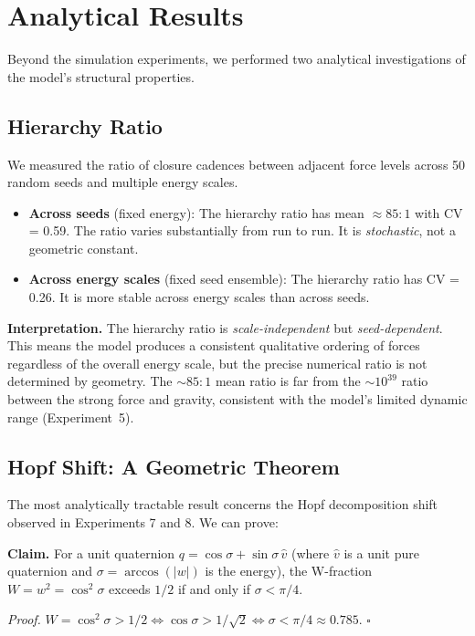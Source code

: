 \documentclass[letterpaper,12pt]{article}
\begin{document}
\section{Analytical Results}

Beyond the simulation experiments, we performed two analytical investigations of the model's structural properties.

\subsection{Hierarchy Ratio}

We measured the ratio of closure cadences between adjacent force levels across 50 random seeds and multiple energy scales.

\begin{itemize}
  \item \textbf{Across seeds} (fixed energy): The hierarchy ratio has mean $\approx 85{:}1$ with CV = 0.59. The ratio varies substantially from run to run. It is \emph{stochastic}, not a geometric constant.
  \item \textbf{Across energy scales} (fixed seed ensemble): The hierarchy ratio has CV = 0.26. It is more stable across energy scales than across seeds.
\end{itemize}

\textbf{Interpretation.} The hierarchy ratio is \emph{scale-independent} but \emph{seed-dependent}. This means the model produces a consistent qualitative ordering of forces regardless of the overall energy scale, but the precise numerical ratio is not determined by geometry. The $\sim 85{:}1$ mean ratio is far from the $\sim 10^{39}$ ratio between the strong force and gravity, consistent with the model's limited dynamic range (Experiment~5).

\subsection{Hopf Shift: A Geometric Theorem}

The most analytically tractable result concerns the Hopf decomposition shift observed in Experiments 7 and 8. We can prove:

\textbf{Claim.} For a unit quaternion $q = \cos\sigma + \sin\sigma\,\hat{v}$ (where $\hat{v}$ is a unit pure quaternion and $\sigma = \arccos(|w|)$ is the energy), the W-fraction $W = w^2 = \cos^2\sigma$ exceeds $1/2$ if and only if $\sigma < \pi/4$.

\emph{Proof.} $W = \cos^2\sigma > 1/2 \iff \cos\sigma > 1/\sqrt{2} \iff \sigma < \pi/4 \approx 0.785$. $\square$
\end{document}
